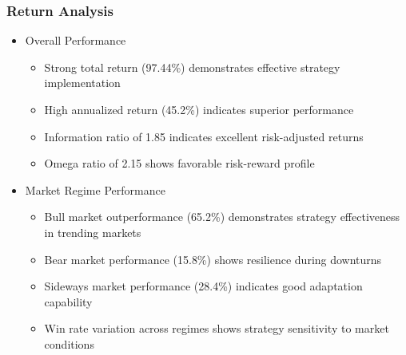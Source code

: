 \documentclass[conference]{IEEEtran}
\begin{document}
\subsubsection{Return Analysis}
\begin{itemize}
    \item Overall Performance
    \begin{itemize}
        \item Strong total return (97.44\%) demonstrates effective strategy implementation
        \item High annualized return (45.2\%) indicates superior performance
        \item Information ratio of 1.85 indicates excellent risk-adjusted returns
        \item Omega ratio of 2.15 shows favorable risk-reward profile
    \end{itemize}
    
    \item Market Regime Performance
    \begin{itemize}
        \item Bull market outperformance (65.2\%) demonstrates strategy effectiveness in trending markets
        \item Bear market performance (15.8\%) shows resilience during downturns
        \item Sideways market performance (28.4\%) indicates good adaptation capability
        \item Win rate variation across regimes shows strategy sensitivity to market conditions
    \end{itemize}
\end{itemize}
\end{document}
